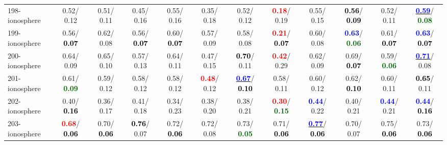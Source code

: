 \begin{table}[h]
\begin{center}
{\begin{tabular}{lc|c|c|c|c|c|c|c|c|c|c}
198-ionosphere &   0.52/  0.12 &   0.51/  0.11 &   0.45/  0.16 &   0.55/  0.16 &   0.35/  0.18 &   0.52/  0.12 & \textcolor{red}{\textbf{  0.18}}/  0.19 &   0.55/  0.15 & \textcolor{black}{\textbf{  0.56}}/\textcolor{black}{\textbf{  0.09}} &   0.52/  0.11 & \underline{\textcolor{blue}{\textbf{  0.59}}}/\textcolor{darkgreen}{\textbf{  0.08}} \\
199-ionosphere &   0.56/\textcolor{black}{\textbf{  0.07}} &   0.62/  0.08 &   0.56/\textcolor{black}{\textbf{  0.07}} &   0.60/\textcolor{black}{\textbf{  0.07}} &   0.57/  0.09 &   0.58/  0.08 & \textcolor{red}{\textbf{  0.21}}/\textcolor{black}{\textbf{  0.07}} &   0.60/  0.08 & \textcolor{blue}{\textbf{  0.63}}/\textcolor{darkgreen}{\textbf{  0.06}} &   0.61/\textcolor{black}{\textbf{  0.07}} & \textcolor{blue}{\textbf{  0.63}}/\textcolor{black}{\textbf{  0.07}} \\ \hline
200-ionosphere &   0.64/  0.09 &   0.65/  0.10 &   0.57/  0.13 &   0.64/  0.11 &   0.47/  0.15 & \textcolor{black}{\textbf{  0.70}}/  0.11 & \textcolor{red}{\textbf{  0.42}}/  0.29 &   0.62/  0.09 &   0.69/\textcolor{black}{\textbf{  0.07}} &   0.59/\textcolor{darkgreen}{\textbf{  0.06}} & \underline{\textcolor{blue}{\textbf{  0.71}}}/  0.08 \\
201-ionosphere &   0.61/\textcolor{darkgreen}{\textbf{  0.09}} &   0.59/  0.12 &   0.58/  0.12 &   0.58/  0.12 & \textcolor{red}{\textbf{  0.48}}/  0.12 & \underline{\textcolor{blue}{\textbf{  0.67}}}/\textcolor{black}{\textbf{  0.10}} &   0.58/  0.11 &   0.60/  0.12 &   0.62/\textcolor{black}{\textbf{  0.10}} &   0.60/  0.11 & \textcolor{black}{\textbf{  0.65}}/  0.11 \\
202-ionosphere &   0.40/\textcolor{black}{\textbf{  0.16}} &   0.36/  0.17 &   0.41/  0.18 &   0.34/  0.23 &   0.38/  0.20 &   0.38/  0.21 & \textcolor{red}{\textbf{  0.30}}/\textcolor{darkgreen}{\textbf{  0.15}} & \textcolor{blue}{\textbf{  0.44}}/  0.22 &   0.40/  0.21 & \textcolor{blue}{\textbf{  0.44}}/  0.21 & \textcolor{blue}{\textbf{  0.44}}/\textcolor{black}{\textbf{  0.16}} \\
203-ionosphere & \textcolor{red}{\textbf{  0.68}}/\textcolor{black}{\textbf{  0.06}} &   0.70/\textcolor{black}{\textbf{  0.06}} & \textcolor{black}{\textbf{  0.76}}/  0.07 &   0.72/\textcolor{black}{\textbf{  0.06}} &   0.72/  0.08 &   0.73/\textcolor{darkgreen}{\textbf{  0.05}} &   0.71/\textcolor{black}{\textbf{  0.06}} & \underline{\textcolor{blue}{\textbf{  0.77}}}/\textcolor{black}{\textbf{  0.06}} &   0.70/  0.07 &   0.75/\textcolor{black}{\textbf{  0.06}} &   0.73/\textcolor{black}{\textbf{  0.06}} \\

\end{tabular}}
\end{center}
\end{table}

